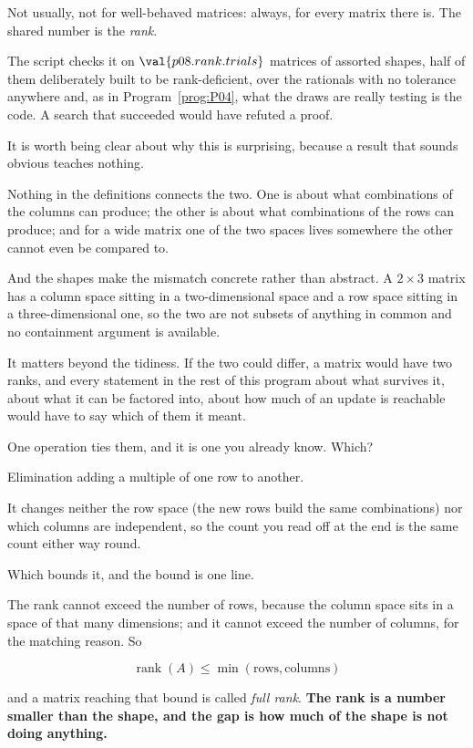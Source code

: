 \begin{fr}
Not usually, not for well-behaved matrices: always, for every matrix there is.
The shared number is the \emph{rank}.

The script checks it on $\val{p08.rank.trials}$ matrices of assorted shapes,
half of them deliberately built to be rank-deficient, over the rationals with
no tolerance anywhere \dash{} and, as in Program~\ref{prog:P04}, what the draws
are really testing is the code. A search that succeeded would have refuted a
proof.
\end{fr}

\begin{fr}
It is worth being clear about why this is surprising, because a result that
sounds obvious teaches nothing.

Nothing in the definitions connects the two. One is about what combinations of
the columns can produce; the other is about what combinations of the rows can
produce; and for a wide matrix one of the two spaces lives somewhere the other
cannot even be compared to.

And the shapes make the mismatch concrete rather than abstract. A
$2 \times 3$ matrix has a column space sitting in a two-dimensional space and
a row space sitting in a three-dimensional one, so the two are not subsets of
anything in common and no containment argument is available.

It matters beyond the tidiness. If the two could differ, a matrix would have
two ranks, and every statement in the rest of this program \dash{} about what
survives it, about what it can be factored into, about how much of an update is
reachable \dash{} would have to say which of them it meant.

One operation ties them, and it is one you already know. Which?
\dotline
\nextframe
\end{fr}

\begin{fr}
\begin{ansblock}
Elimination \dash{} adding a multiple of one row to another.
\end{ansblock}

It changes neither the row space (the new rows build the same combinations) nor
which columns are independent, so the count you read off at the end is the same
count either way round.

Which bounds it, and the bound is one line.

The rank cannot exceed the number of rows, because the column space sits in a
space of that many dimensions; and it cannot exceed the number of columns, for
the matching reason. So

\[ \operatorname{rank}(A) \le \min(\text{rows}, \text{columns}) \]

and a matrix reaching that bound is called \emph{full rank}. \textbf{The rank is
a number smaller than the shape, and the gap is how much of the shape is not
doing anything.}
\end{fr}


